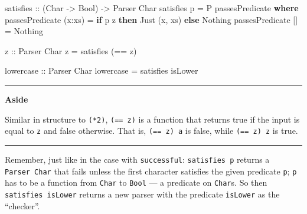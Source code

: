 \documentclass[]{article}
\newenvironment{Shaded}{}{}
\newcommand{\CharTok}[1]{\textcolor[rgb]{0.25,0.44,0.63}{#1}}
\newcommand{\DataTypeTok}[1]{\textcolor[rgb]{0.56,0.13,0.00}{#1}}
\newcommand{\FunctionTok}[1]{\textcolor[rgb]{0.02,0.16,0.49}{#1}}
\newcommand{\KeywordTok}[1]{\textcolor[rgb]{0.00,0.44,0.13}{\textbf{#1}}}
\newcommand{\NormalTok}[1]{#1}
\newcommand{\OperatorTok}[1]{\textcolor[rgb]{0.40,0.40,0.40}{#1}}
\newcommand{\OtherTok}[1]{\textcolor[rgb]{0.00,0.44,0.13}{#1}}
\begin{document}
\begin{Shaded}
\begin{Highlighting}[]
\OtherTok{satisfies ::}\NormalTok{ (}\DataTypeTok{Char} \OtherTok{{-}>} \DataTypeTok{Bool}\NormalTok{) }\OtherTok{{-}>} \DataTypeTok{Parser} \DataTypeTok{Char}
\NormalTok{satisfies p }\OtherTok{=} \DataTypeTok{P}\NormalTok{ passesPredicate}
    \KeywordTok{where}
\NormalTok{        passesPredicate (x}\OperatorTok{:}\NormalTok{xs) }\OtherTok{=}  \KeywordTok{if}\NormalTok{ p z}
                                      \KeywordTok{then} \DataTypeTok{Just}\NormalTok{ (x, xs)}
                                      \KeywordTok{else} \DataTypeTok{Nothing}
\NormalTok{        passesPredicate []     }\OtherTok{=}  \DataTypeTok{Nothing}


\OtherTok{z ::} \DataTypeTok{Parser} \DataTypeTok{Char}
\NormalTok{z }\OtherTok{=}\NormalTok{ satisfies (}\OperatorTok{==} \CharTok{\textquotesingle{}z\textquotesingle{}}\NormalTok{)}

\OtherTok{lowercase ::} \DataTypeTok{Parser} \DataTypeTok{Char}
\NormalTok{lowercase }\OtherTok{=}\NormalTok{ satisfies }\FunctionTok{isLower}
\end{Highlighting}
\end{Shaded}

\begin{center}\rule{0.5\linewidth}{\linethickness}\end{center}

\textbf{Aside}

Similar in structure to \texttt{(*2)},
\texttt{(==\ \textquotesingle{}z\textquotesingle{})} is a function that returns
true if the input is equal to \texttt{\textquotesingle{}z\textquotesingle{}} and
false otherwise. That is,
\texttt{(==\ \textquotesingle{}z\textquotesingle{})\ \textquotesingle{}a\textquotesingle{}}
is false, while
\texttt{(==\ \textquotesingle{}z\textquotesingle{})\ \textquotesingle{}z\textquotesingle{}}
is true.

\begin{center}\rule{0.5\linewidth}{\linethickness}\end{center}

Remember, just like in the case with \texttt{successful}: \texttt{satisfies\ p}
returns a \texttt{Parser\ Char} that fails unless the first character satisfies
the given predicate \texttt{p}; \texttt{p} has to be a function from
\texttt{Char} to \texttt{Bool} --- a predicate on \texttt{Char}s. So then
\texttt{satisfies\ isLower} returns a new parser with the predicate
\texttt{isLower} as the ``checker''.
\end{document}
